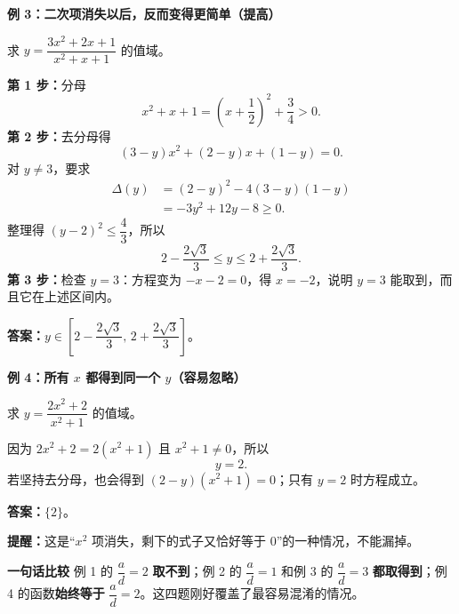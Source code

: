 \clearpage
\begin{examplebox}
\textbf{\textcolor{CExample}{例 3：二次项消失以后，反而变得更简单（提高）}}
\begin{center}\end{center}


  \medskip
  求 $y=\dfrac{3x^2+2x+1}{x^2+x+1}$ 的值域。

  \medskip
  \textbf{第 1 步：}分母
  \[
    x^2+x+1=\left(x+\frac12\right)^2+\frac34>0.
  \]
  \textbf{第 2 步：}去分母得
  \[
    (3-y)x^2+(2-y)x+(1-y)=0.
  \]
  对 $y\ne3$，要求
  \[
    \begin{aligned}
      \Delta(y)&=(2-y)^2-4(3-y)(1-y)\\
      &=-3y^2+12y-8\ge0.
    \end{aligned}
  \]
  整理得 $(y-2)^2\le\dfrac43$，所以
  \[
    2-\frac{2\sqrt3}{3}\le y\le2+\frac{2\sqrt3}{3}.
  \]
  \textbf{第 3 步：}检查 $y=3$：方程变为 $-x-2=0$，得 $x=-2$，说明 $y=3$ 能取到，而且它在上述区间内。

  \textbf{答案：}\quad $\boxed{y\in\left[2-\dfrac{2\sqrt3}{3},\,2+\dfrac{2\sqrt3}{3}\right]}$。

  \medskip
\end{examplebox}
\clearpage
\begin{examplebox}
\textbf{\textcolor{CExample}{例 4：所有 $x$ 都得到同一个 $y$（容易忽略）}}
\begin{center}\end{center}


  \medskip
  求 $y=\dfrac{2x^2+2}{x^2+1}$ 的值域。

  \medskip
  因为 $2x^2+2=2(x^2+1)$ 且 $x^2+1\ne0$，所以
  \[
    y=2.
  \]
  若坚持去分母，也会得到 $(2-y)(x^2+1)=0$；只有 $y=2$ 时方程成立。

  \textbf{答案：}\quad $\boxed{\{2\}}$。
  \par\textbf{提醒：}这是“$x^2$ 项消失，剩下的式子又恰好等于 $0$”的一种情况，不能漏掉。

  \medskip
  \textbf{\textcolor{CExample}{一句话比较}}
  例 1 的 $\dfrac ad=2$ \textbf{取不到}；例 2 的 $\dfrac ad=1$ 和例 3 的 $\dfrac ad=3$ \textbf{都取得到}；例 4 的函数\textbf{始终等于} $\dfrac ad=2$。这四题刚好覆盖了最容易混淆的情况。
\end{examplebox}


